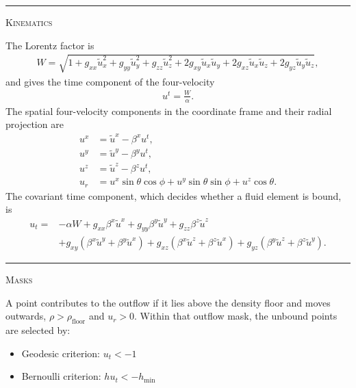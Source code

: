\documentclass{article}
\newcommand{\step}[1]{%
  \par\medskip\noindent
  {\color{stepfg}\rule[-0.15ex]{2pt}{1.5ex}\hspace{0.5em}\scshape #1}%
  \hspace{0.75em}\ignorespaces}
\begin{document}
\step{Kinematics} The Lorentz factor is
\begin{align}
  W = \sqrt{1+g_{xx}\tilde{u}_x^2+g_{yy}\tilde{u}_y^2+g_{zz}\tilde{u}_z^2
      +2g_{xy}\tilde{u}_{x}\tilde{u}_{y}+2g_{xz}\tilde{u}_{x}\tilde{u}_{z}
      +2g_{yz}\tilde{u}_{y}\tilde{u}_{z}},
\end{align}
and gives the time component of the four-velocity
\begin{align}
  u^t = \frac{W}{\alpha}.
\end{align}
The spatial four-velocity components in the coordinate frame and their radial
projection are
\begin{align}
  u^x &= \tilde{u}^x-\beta^{x}u^t,\\
  u^y &= \tilde{u}^y-\beta^{y}u^t,\\
  u^z &= \tilde{u}^z-\beta^{z}u^t,\\
  u_r &= u^x\sin{\theta}\cos{\phi}+u^y\sin{\theta}\sin{\phi}+u^z\cos{\theta}.
\end{align}
The covariant time component, which decides whether a fluid element is bound, is
\begin{align}
  u_t =& -\alpha W
        +g_{xx}\beta^{x}\tilde{u}^{x}+g_{yy}\beta^{y}\tilde{u}^{y}+g_{zz}\beta^{z}\tilde{u}^{z}\\
       &+g_{xy}\left(\beta^{x}\tilde{u}^{y}+\beta^{y}\tilde{u}^{x}\right)
        +g_{xz}\left(\beta^{x}\tilde{u}^{z}+\beta^{z}\tilde{u}^{x}\right)
        +g_{yz}\left(\beta^{y}\tilde{u}^{z}+\beta^{z}\tilde{u}^{y}\right).
\end{align}

\step{Masks} A point contributes to the outflow if it lies above the density
floor and moves outwards, $\rho>\rho_{\mathrm{floor}}$ and $u_r>0$. Within that
outflow mask, the unbound points are selected by:
\begin{itemize}
  \item Geodesic criterion: $u_t < -1$
  \item Bernoulli criterion: $hu_t < -h_{\mathrm{min}}$
\end{itemize}
\end{document}
